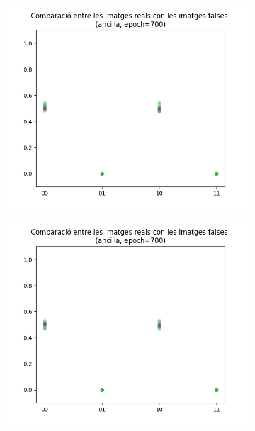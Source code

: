 \begin{figure}[H]
	\begin{subfigure}[b]{.32\linewidth}
		\includegraphics[width=\linewidth]{figures/data/scatter_plot_A4.png}
		\caption{}
	\end{subfigure}
	\begin{subfigure}[b]{.32\linewidth}
		\includegraphics[width=\linewidth]{figures/data/scatter_plot_A5.png}
		\caption{}
	\end{subfigure}
	\begin{subfigure}[b]{.32\linewidth}

\end{subfigure}
\end{figure}
